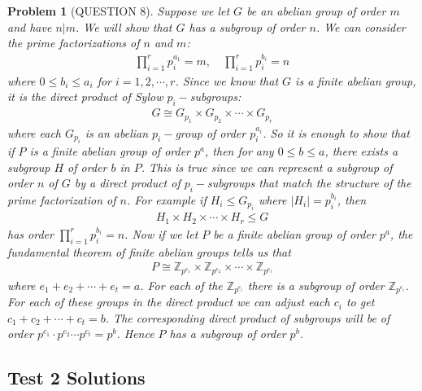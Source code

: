\documentclass[titlepage]{article}
\theoremstyle{plain}
\newtheorem{problem}[theorem]{Problem}
\theoremstyle{definition}
\theoremstyle{remark}
\theoremstyle{exercise-style}
\numberwithin{equation}{section}
\numberwithin{theorem}{section}
\numberwithin{remark}{section}
\begin{document}
\begin{problem}[QUESTION 8]
    Suppose we let $G$ be an abelian group of order $m$ and have $n | m$. We will show that $G$ has a subgroup of order $n$. We can consider the prime factorizations of $n$ and $m$:
    \begin{align}
        \prod_{i = 1}^{r}p_i^{a_1} = m, \quad \prod_{i = 1}^{r}p_i^{b_i} = n
    \end{align}
    where $0 \leq b_i \leq a_i$ for $i = 1, 2, \cdots, r$. Since we know that $G$ is a finite abelian group, it is the direct product of Sylow $p_i-$subgroups:
    \begin{align}
        G \cong G_{p_1} \times G_{p_2} \times \cdots \times G_{p_r}
    \end{align}
    where each $G_{p_i}$ is an abelian $p_i-$group of order $p_i^{a_i}$. So it is enough to show that if $P$ is a finite abelian group of order $p^a$, then for any $0 \leq b \leq a$, there exists a subgroup $H$ of order $b$ in $P$. This is true since we can represent a subgroup of order $n$ of $G$ by a direct product of $p_i-$subgroups that match the structure of the prime factorization of $n$. For example if $H_i \leq G_{p_i}$ where $|H_i| = p_{i}^{b_i}$, then 
    \begin{align}
        H_1 \times H_2 \times \cdots \times H_r \leq G
    \end{align}
    has order $\prod_{i = 1}^{r}p_i^{b_i} = n$.
    Now if we let $P$ be a finite abelian group of order $p^a$, the fundamental theorem of finite abelian groups tells us that
    \begin{align}
        P \cong \mathbb{Z}_{p^{e_1}} \times \mathbb{Z}_{p^{e_2}}  \times \cdots \times \mathbb{Z}_{p^{e_t}}
    \end{align}
    where $e_1 + e_2 + \cdots + e_t = a$. For each of the $\mathbb{Z}_{p^{e_i}}$ there is a subgroup of order $\mathbb{Z}_{p^{c_i}}$. For each of these groups in the direct product we can adjust each $c_i$ to get $c_1 + c_2 + \cdots +c_t = b$. The corresponding direct product of subgroups will be of order $p^{c_1}\cdot p^{c_2}\cdots p^{c_t}= p^b$. Hence $P$ has a subgroup of order $p^b$.
\end{problem}

\subsection{Test 2 Solutions}


\end{document}
